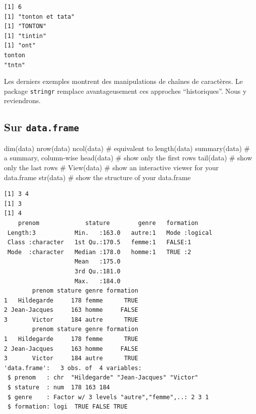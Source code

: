 \documentclass[
  letterpaper,
  DIV=11,
  numbers=noendperiod]{scrreprt}
\newenvironment{Shaded}{\begin{snugshade}}{\end{snugshade}}
\newcommand{\CommentTok}[1]{\textcolor[rgb]{0.37,0.37,0.37}{#1}}
\newcommand{\FunctionTok}[1]{\textcolor[rgb]{0.28,0.35,0.67}{#1}}
\newcommand{\NormalTok}[1]{\textcolor[rgb]{0.00,0.23,0.31}{#1}}
\begin{document}
\begin{verbatim}
[1] 6
[1] "tonton et tata"
[1] "TONTON"
[1] "tintin"
[1] "ont"
tonton 
"tntn" 
\end{verbatim}

Les derniers exemples montrent des manipulations de chaînes de
caractères. Le package \texttt{stringr} remplace avantageusement ces
approches ``historiques''. Nous y reviendrons.

\hypertarget{sur-data.frame}{%
\subsection{\texorpdfstring{Sur
\texttt{data.frame}}{Sur data.frame}}\label{sur-data.frame}}

\begin{Shaded}
\begin{Highlighting}[]
\FunctionTok{dim}\NormalTok{(data)}
\FunctionTok{nrow}\NormalTok{(data)}
\FunctionTok{ncol}\NormalTok{(data) }\CommentTok{\# equivalent to length(data)}
\FunctionTok{summary}\NormalTok{(data) }\CommentTok{\# a summary, column{-}wise}
\FunctionTok{head}\NormalTok{(data) }\CommentTok{\# show only the first rows}
\FunctionTok{tail}\NormalTok{(data) }\CommentTok{\# show only the last rows}
\CommentTok{\# View(data) \# show an interactive viewer for your data.frame}
\FunctionTok{str}\NormalTok{(data)  }\CommentTok{\# show the structure of your data.frame}
\end{Highlighting}
\end{Shaded}

\begin{verbatim}
[1] 3 4
[1] 3
[1] 4
    prenom             stature        genre   formation      
 Length:3           Min.   :163.0   autre:1   Mode :logical  
 Class :character   1st Qu.:170.5   femme:1   FALSE:1        
 Mode  :character   Median :178.0   homme:1   TRUE :2        
                    Mean   :175.0                            
                    3rd Qu.:181.0                            
                    Max.   :184.0                            
        prenom stature genre formation
1   Hildegarde     178 femme      TRUE
2 Jean-Jacques     163 homme     FALSE
3       Victor     184 autre      TRUE
        prenom stature genre formation
1   Hildegarde     178 femme      TRUE
2 Jean-Jacques     163 homme     FALSE
3       Victor     184 autre      TRUE
'data.frame':   3 obs. of  4 variables:
 $ prenom   : chr  "Hildegarde" "Jean-Jacques" "Victor"
 $ stature  : num  178 163 184
 $ genre    : Factor w/ 3 levels "autre","femme",..: 2 3 1
 $ formation: logi  TRUE FALSE TRUE
\end{verbatim}
\end{document}
